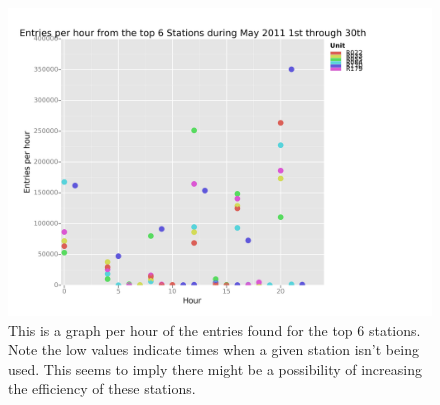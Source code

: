 \documentclass{article}
\numberwithin{questionCtr}{section}
\numberwithin{problemCtr}{section}
\begin{document}
\begin{figure}[ht]
  \centering
  \includegraphics[width=\textwidth]{high_unit_per_hour.png}
  \caption{This is a graph per hour of the entries found for the top 6 stations.
  Note the low values indicate times when a given station isn't being used.
This seems to imply there might be a possibility of increasing the efficiency of
these stations.}
\label{fig:high_unit_per_hour}
\end{figure}
\printbibliography[keyword=Python , title={Python references}]
\printbibliography[keyword=SQL , title={SQL references}]
\printbibliography[keyword=Udacity , title={Udacity references}]
\printbibliography[keyword=statistics , title={Statistics references}]
\printbibliography[keyword=machine.learning, title={Machine Learning references}]
\printbibliography[keyword=ggplot , title={ggplot references}]
\printbibliography[keyword=other , title={other references}]
\end{document}
